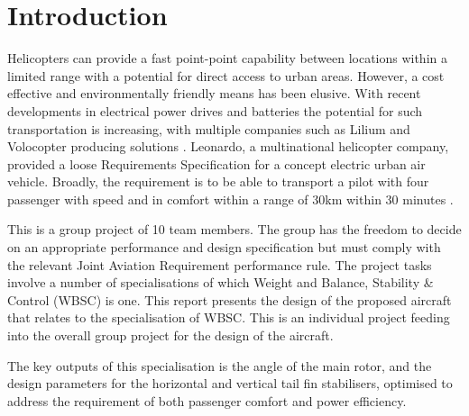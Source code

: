 \documentclass[11pt,a4paper]{article}
\begin{document}
\section{Introduction}
Helicopters can provide a fast point-point capability between locations within a limited range with a potential for direct access to urban areas. However, a cost effective and environmentally friendly means has been elusive. With recent developments in electrical power drives and batteries the potential for such transportation is increasing, with multiple companies such as Lilium and Volocopter producing solutions \cite{bbc}. Leonardo, a multinational helicopter company, provided a loose Requirements Specification for a concept electric urban air vehicle. Broadly, the requirement is to be able to transport a pilot with four passenger with speed and in comfort within a range of 30km within 30 minutes . 

This is a group project of 10 team members. The group has the freedom to decide on an appropriate performance and design specification but must comply with the relevant Joint Aviation Requirement performance rule. The project tasks involve a number of specialisations of which Weight and Balance, Stability \& Control (WBSC) is one. This report presents the design of the proposed aircraft that relates to the specialisation of WBSC. This is an individual project feeding into the overall group project for the design of the aircraft.

The key outputs of this specialisation is the angle of the main rotor, and the design parameters for the horizontal and vertical tail fin stabilisers, optimised to address the requirement of both passenger comfort and power efficiency.
\end{document}
